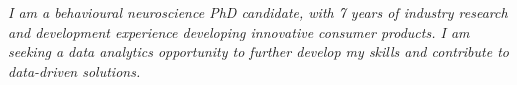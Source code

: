 
\textit{I am a behavioural neuroscience PhD candidate, with 7 years of industry research and development experience developing innovative consumer products. I am seeking a data analytics opportunity to further develop my skills and contribute to data-driven solutions.}
